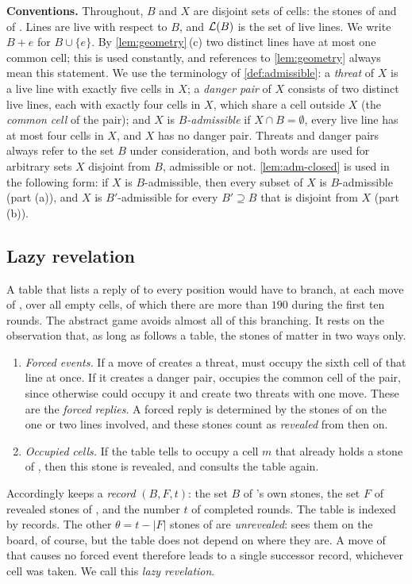 \medskip\noindent\textbf{Conventions.}
Throughout, $B$ and $X$ are disjoint sets of cells: the stones of \Breaker{} and of \Maker. Lines are live
with respect to $B$, and $\mathcal{L}(B)$ is the set of live lines. We write $B+e$ for $B\cup\{e\}$. By
\cref{lem:geometry}\,(c) two distinct lines have at most one common cell; this is used constantly, and
references to \cref{lem:geometry} always mean this statement. We use
the terminology of \cref{def:admissible}: a \emph{threat} of $X$ is a live line with exactly five cells in
$X$; a \emph{danger pair} of $X$ consists of two distinct live lines, each with exactly four cells in $X$,
which share a cell outside $X$ (the \emph{common cell} of the pair); and $X$ is \emph{$B$-admissible} if
$X\cap B=\emptyset$, every live line has at most four cells in $X$, and $X$ has no danger pair. Threats and
danger pairs always refer to the set $B$ under consideration, and both words are used for arbitrary sets
$X$ disjoint from $B$, admissible or not. \cref{lem:adm-closed} is used in the following form: if $X$ is
$B$-admissible, then every subset of $X$ is $B$-admissible (part (a)), and $X$ is $B'$-admissible for every
$B'\supseteq B$ that is disjoint from $X$ (part (b)).

\subsection{Lazy revelation}\label{sec:lazy}

A table that lists a reply of \Breaker{} to every position would have to branch, at each move of \Maker, over
all empty cells, of which there are more than $190$ during the first ten rounds. The abstract game avoids
almost all of this branching. It rests on the observation that, as long as \Breaker{} follows a table, the
stones of \Maker{} matter in two ways only.
\begin{enumerate}[label=\textup{(\roman*)},leftmargin=2.2em]
\item \emph{Forced events.} If a move of \Maker{} creates a threat, \Breaker{} must occupy the sixth cell of
  that line at once. If it creates a danger pair, \Breaker{} occupies the common cell of the pair, since
  otherwise \Maker{} could occupy it and create two threats with one move. These are the \emph{forced
  replies}. A forced reply is determined by the stones of \Maker{} on the one or two lines involved, and these
  stones count as \emph{revealed} from then on.
\item \emph{Occupied cells.} If the table tells \Breaker{} to occupy a cell $m$ that already holds a stone of
  \Maker, then this stone is revealed, and \Breaker{} consults the table again.
\end{enumerate}
Accordingly \Breaker{} keeps a \emph{record} $(B,F,t)$: the set $B$ of \Breaker's own stones, the set $F$ of
revealed stones of \Maker, and the number $t$ of completed rounds. The table is indexed by records. The other
$\theta=t-|F|$ stones of \Maker{} are \emph{unrevealed}: \Breaker{} sees them on the board, of course, but
the table does not depend on where they are. A move of \Maker{} that causes no forced event therefore leads
to a single successor record, whichever cell was taken. We call this \emph{lazy revelation}.

